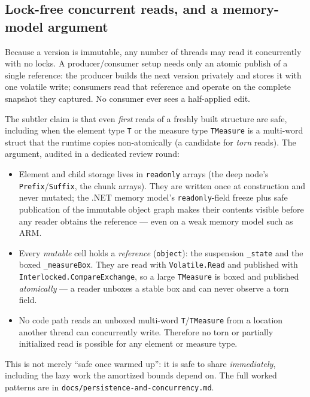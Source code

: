 \documentclass[11pt]{article}
\newcommand{\cs}[1]{\lstinline|#1|}
\begin{document}
\subsection{Lock-free concurrent reads, and a memory-model argument}

Because a version is immutable, any number of threads may read it concurrently with no locks. A
producer/consumer setup needs only an atomic publish of a single reference: the producer builds the next
version privately and stores it with one volatile write; consumers read that reference and operate on the
complete snapshot they captured. No consumer ever sees a half-applied edit.

The subtler claim is that even \emph{first} reads of a freshly built structure are safe, including when
the element type \cs{T} or the measure type \cs{TMeasure} is a multi-word struct that the runtime copies
non-atomically (a candidate for \emph{torn} reads). The argument, audited in a dedicated review round:

\begin{itemize}[leftmargin=1.4em, itemsep=1pt]
  \item Element and child storage lives in \cs{readonly} arrays (the deep node's \cs{Prefix}/\cs{Suffix},
    the chunk arrays). They are written once at construction and never mutated; the .NET memory model's
    \cs{readonly}-field freeze plus safe publication of the immutable object graph makes their contents
    visible before any reader obtains the reference --- even on a weak memory model such as ARM.
  \item Every \emph{mutable} cell holds a \emph{reference} (\cs{object}): the suspension \cs{_state} and
    the boxed \cs{_measureBox}. They are read with \cs{Volatile.Read} and published with
    \cs{Interlocked.CompareExchange}, so a large \cs{TMeasure} is boxed and published \emph{atomically} ---
    a reader unboxes a stable box and can never observe a torn field.
  \item No code path reads an unboxed multi-word \cs{T}/\cs{TMeasure} from a location another thread can
    concurrently write. Therefore no torn or partially initialized read is possible for any element or
    measure type.
\end{itemize}

This is not merely ``safe once warmed up'': it is safe to share \emph{immediately}, including the lazy
work the amortized bounds depend on. The full worked patterns are in
\texttt{docs/persistence-and-concurrency.md}.
\end{document}
